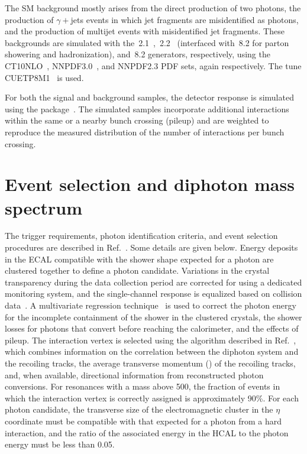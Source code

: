 The SM background mostly arises from the direct production of two photons,
the production of $\gamma+$jets events in which jet fragments are misidentified as photons,
and the production of multijet events with misidentified jet fragments.
These backgrounds are simulated
with the \SHERPA\,2.1~\cite{Gleisberg:2008ta},
\MGAMC\,2.2~\cite{Alwall:2014hca}
(interfaced with \PYTHIA\,8.2 for parton showering and hadronization),
and \PYTHIA\,8.2 generators, respectively,
using the CT10NLO~\cite{Lai:2010vv},
NNPDF3.0~\cite{Ball:2014uwa},
and NNPDF2.3 PDF sets,
again respectively.
The \PYTHIA tune CUETP8M1~\cite{Khachatryan:2015pea} is used.

For both the signal and background samples,
the detector response is simulated
using the \GEANTfour package~\cite{Agostinelli:2002hh}.
The simulated samples incorporate additional {\Pp\Pp} interactions
within the same or a nearby bunch crossing (pileup)
and are weighted to reproduce the measured distribution
of the number of interactions per bunch crossing.

\section{Event selection and diphoton mass spectrum}
\label{sec:event_sel}

The trigger requirements,
photon identification criteria,
and event selection procedures are
described in Ref.~\cite{cms-dipho-2015}.
Some details are given below.
Energy deposits in the ECAL compatible with the shower shape expected for
a photon are clustered together to define a photon candidate.
Variations in the crystal transparency during the data collection period are
corrected for using a dedicated monitoring system,
and the single-channel response is equalized based on collision
data~\cite{CMS:EGM-14-001}.
A multivariate regression technique~\cite{CMS:EGM-14-001} is used to correct the photon
energy for the incomplete containment of the shower in the clustered crystals, the shower
losses for photons that convert before reaching the calorimeter, and the effects of
pileup.
The interaction vertex is selected using the algorithm described in
Ref.~\cite{Khachatryan:2014ira},
which combines information on the correlation between
the diphoton system and the recoiling tracks,
the average transverse momentum (\pt) of the recoiling tracks,
and, when available,
directional information from reconstructed photon conversions.
For resonances with a mass above 500\GeV,
the fraction of events in which the interaction vertex is correctly
assigned is approximately 90\%.
For each photon candidate,
the transverse size of the electromagnetic cluster in the $\eta$ coordinate
must be compatible with that expected for a photon from a hard interaction,
and the ratio of the associated energy in the HCAL to the photon energy must
be less than 0.05.

